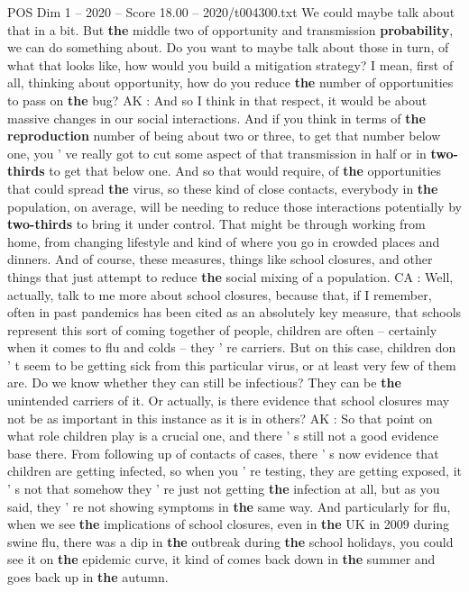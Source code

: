 \begin{textsample}{POS Dim 1 – 2020 – Score 18.00 – 2020/t004300.txt}
We could maybe talk about that in a bit.
But \textbf{the} middle two of opportunity and transmission \textbf{probability}, we can do something about.
Do you want to maybe talk about those in turn, of what that looks like, how would you build a mitigation strategy?
I mean, first of all, thinking about opportunity, how do you reduce \textbf{the} number of opportunities to pass on \textbf{the} bug?
AK : And so I think in that respect, it would be about massive changes in our social interactions.
And if you think in terms of \textbf{the} \textbf{reproduction} number of being about two or three, to get that number below one, you ' ve really got to cut some aspect of that transmission in half or in \textbf{two-thirds} to get that below one.
And so that would require, of \textbf{the} opportunities that could spread \textbf{the} virus, so these kind of close contacts, everybody in \textbf{the} population, on average, will be needing to reduce those interactions potentially by \textbf{two-thirds} to bring it under control.
That might be through working from home, from changing lifestyle and kind of where you go in crowded places and dinners.
And of course, these measures, things like school closures, and other things that just attempt to reduce \textbf{the} social mixing of a population.
CA : Well, actually, talk to me more about school closures, because that, if I remember, often in past pandemics has been cited as an absolutely key measure, that schools represent this sort of coming together of people, children are often -- certainly when it comes to flu and colds -- they ' re carriers.
But on this case, children don ' t seem to be getting sick from this particular virus, or at least very few of them are.
Do we know whether they can still be infectious?
They can be \textbf{the} unintended carriers of it.
Or actually, is there evidence that school closures may not be as important in this instance as it is in others?
AK : So that point on what role children play is a crucial one, and there ' s still not a good evidence base there.
From following up of contacts of cases, there ' s now evidence that children are getting infected, so when you ' re testing, they are getting exposed, it ' s not that somehow they ' re just not getting \textbf{the} infection at all, but as you said, they ' re not showing symptoms in \textbf{the} same way.
And particularly for flu, when we see \textbf{the} implications of school closures, even in \textbf{the} UK in 2009 during swine flu, there was a dip in \textbf{the} outbreak during \textbf{the} school holidays, you could see it on \textbf{the} epidemic curve, it kind of comes back down in \textbf{the} summer and goes back up in \textbf{the} autumn.

\end{textsample}
